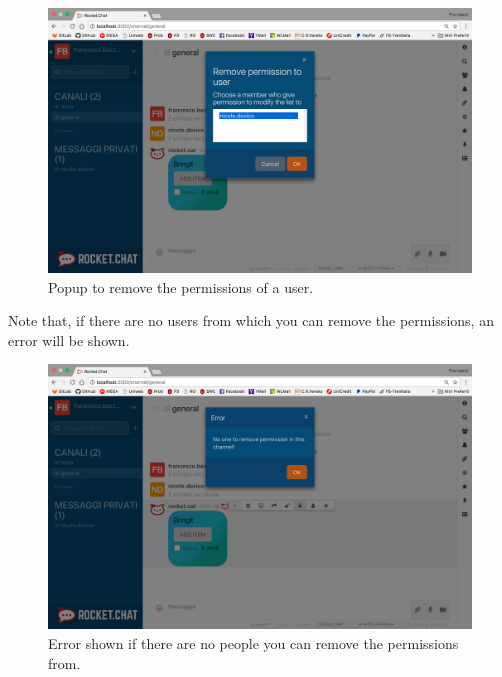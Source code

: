 \begin{figure}[H]
  \centering 
  \includegraphics[width=\textwidth]{Sections/3-HowToUse/Images/permission_remove.png}
  \caption{Popup to remove the permissions of a user.}
\end{figure}

Note that, if there are no users from which you can remove the permissions, an error will be shown.

\begin{figure}[H]
  \centering 
  \includegraphics[width=\textwidth]{Sections/3-HowToUse/Images/permission_remove_error.png}
  \caption{Error shown if there are no people you can remove the permissions from.}
\end{figure}